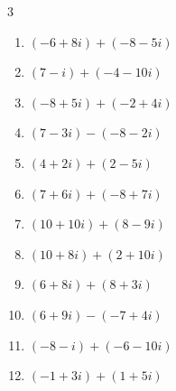 \begin{multicols}{3}
\begin{enumerate}
        \phantom{$\displaystyle =-11-3i$}

  \item $\displaystyle (-6+8i) + (-8-5i)$

        \phantom{$\displaystyle =-14+3i$}

  \item $\displaystyle (7-i) + (-4-10i)$

        \phantom{$\displaystyle =3-11i$}

  \item $\displaystyle (-8+5i) + (-2+4i)$

        \phantom{$\displaystyle =-10+9i$}

  \item $\displaystyle (7-3i) - (-8-2i)$

        \phantom{$\displaystyle =15-i$}

  \item $\displaystyle (4+2i) + (2-5i)$

        \phantom{$\displaystyle =6-3i$}

  \item $\displaystyle (7+6i) + (-8+7i)$

        \phantom{$\displaystyle =-1+13i$}

  \item $\displaystyle (10+10i) + (8-9i)$

        \phantom{$\displaystyle =18+i$}

  \item $\displaystyle (10+8i) + (2+10i)$

        \phantom{$\displaystyle =12+18i$}

  \item $\displaystyle (6+8i) + (8+3i)$

        \phantom{$\displaystyle =14+11i$}

  \item $\displaystyle (6+9i) - (-7+4i)$

        \phantom{$\displaystyle =13+5i$}

\columnbreak %

\resetques

  \item $\displaystyle (-8-i) + (-6-10i)$

        \phantom{$\displaystyle =-14-11i$}

  \item $\displaystyle (-1+3i) + (1+5i)$

        \phantom{$\displaystyle =8i$}


\end{enumerate}
\end{multicols}
